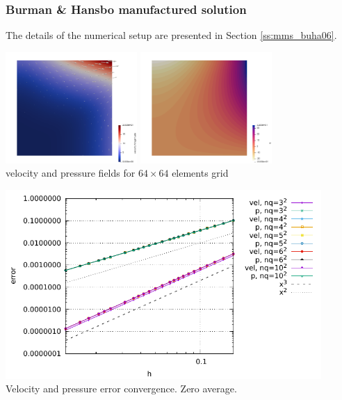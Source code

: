 \subsubsection*{Burman \& Hansbo manufactured solution}

The details of the numerical setup are presented in Section \ref{ss:mms_buha06}.

\begin{center}
\includegraphics[width=5cm]{python_codes/fieldstone_18/results/buha06/vel}
\includegraphics[width=5cm]{python_codes/fieldstone_18/results/buha06/p}\\
{\captionfont velocity and pressure fields for $64\times 64$ elements grid}
\end{center}

\begin{center}
\includegraphics[width=12cm]{python_codes/fieldstone_18/results/buha06/errors}\\
{\captionfont Velocity and pressure error convergence. Zero average.}
\end{center}

